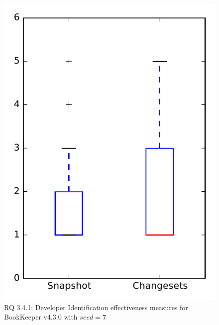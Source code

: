 
\begin{figure}
\centering
\includegraphics[height=0.4\textheight]{figures/dit_seed/rq1_bookkeeper_7}
\caption{RQ 3.4.1: Developer Identification effectiveness measures for BookKeeper v4.3.0 with $seed=7$}
\label{fig:dit_seed:rq1:bookkeeper}
\end{figure}
